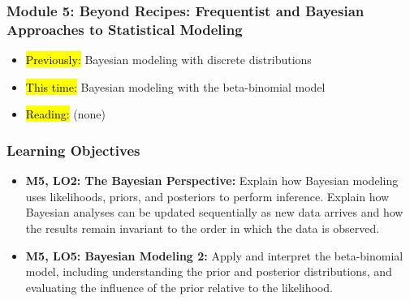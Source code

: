 
\begin{frame}
    \frametitle{Module 5: Beyond Recipes: Frequentist and Bayesian Approaches to Statistical Modeling}
    \begin{itemize}
        \item \hl{Previously: }Bayesian modeling with discrete distributions
        \item \hl{This time: }Bayesian modeling with the beta-binomial model
        \item \hl{Reading: }(none)
    \end{itemize}

\end{frame}
\begin{frame}
    \frametitle{Learning Objectives}
    \begin{itemize}
        \item \textbf{M5, LO2: The Bayesian Perspective:} Explain how Bayesian modeling uses likelihoods, priors, and posteriors to perform inference. Explain how Bayesian analyses can be updated sequentially as new data arrives and how the results remain invariant to the order in which the data is observed.
        \item \textbf{M5, LO5: Bayesian Modeling 2:} Apply and interpret the beta-binomial model, including understanding the prior and posterior distributions, and evaluating the influence of the prior relative to the likelihood.
    \end{itemize}
\end{frame}
